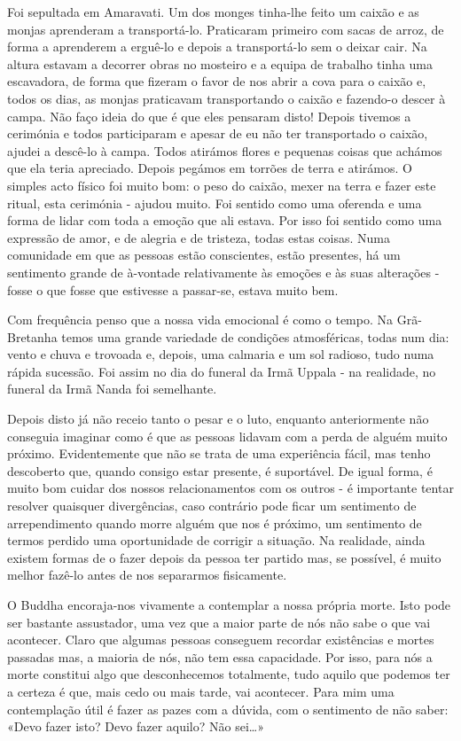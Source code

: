 Foi sepultada em Amaravati. Um dos monges tinha-lhe feito um caixão e as
monjas aprenderam a transportá-lo. Praticaram primeiro com sacas de
arroz, de forma a aprenderem a erguê-lo e depois a transportá-lo sem o
deixar cair. Na altura estavam a decorrer obras no mosteiro e a equipa
de trabalho tinha uma escavadora, de forma que fizeram o favor de nos
abrir a cova para o caixão e, todos os dias, as monjas praticavam
transportando o caixão e fazendo-o descer à campa. Não faço ideia do que
é que eles pensaram disto! Depois tivemos a cerimónia e todos
participaram e apesar de eu não ter transportado o caixão, ajudei a
descê-lo à campa. Todos atirámos flores e pequenas coisas que achámos
que ela teria apreciado. Depois pegámos em torrões de terra e atirámos.
O simples acto físico foi muito bom: o peso do caixão, mexer na terra e
fazer este ritual, esta cerimónia - ajudou muito. Foi sentido como uma
oferenda e uma forma de lidar com toda a emoção que ali estava. Por isso
foi sentido como uma expressão de amor, e de alegria e de tristeza,
todas estas coisas. Numa comunidade em que as pessoas estão conscientes,
estão presentes, há um sentimento grande de à-vontade relativamente às
emoções e às suas alterações - fosse o que fosse que estivesse a
passar-se, estava muito bem.

Com frequência penso que a nossa vida emocional é como o tempo. Na
Grã-Bretanha temos uma grande variedade de condições atmosféricas, todas
num dia: vento e chuva e trovoada e, depois, uma calmaria e um sol
radioso, tudo numa rápida sucessão. Foi assim no dia do funeral da Irmã
Uppala - na realidade, no funeral da Irmã Nanda foi semelhante.

Depois disto já não receio tanto o pesar e o luto, enquanto
anteriormente não conseguia imaginar como é que as pessoas lidavam com a
perda de alguém muito próximo. Evidentemente que não se trata de uma
experiência fácil, mas tenho descoberto que, quando consigo estar
presente, é suportável. De igual forma, é muito bom cuidar dos nossos
relacionamentos com os outros - é importante tentar resolver quaisquer
divergências, caso contrário pode ficar um sentimento de arrependimento
quando morre alguém que nos é próximo, um sentimento de termos perdido
uma oportunidade de corrigir a situação. Na realidade, ainda existem
formas de o fazer depois da pessoa ter partido mas, se possível, é muito
melhor fazê-lo antes de nos separarmos fisicamente.

O Buddha encoraja-nos vivamente a contemplar a nossa própria morte. Isto
pode ser bastante assustador, uma vez que a maior parte de nós não sabe
o que vai acontecer. Claro que algumas pessoas conseguem recordar
existências e mortes passadas mas, a maioria de nós, não tem essa
capacidade. Por isso, para nós a morte constitui algo que desconhecemos
totalmente, tudo aquilo que podemos ter a certeza é que, mais cedo ou
mais tarde, vai acontecer. Para mim uma contemplação útil é fazer as
pazes com a dúvida, com o sentimento de não saber: «Devo fazer isto?
Devo fazer aquilo? Não sei\ldots{}»

